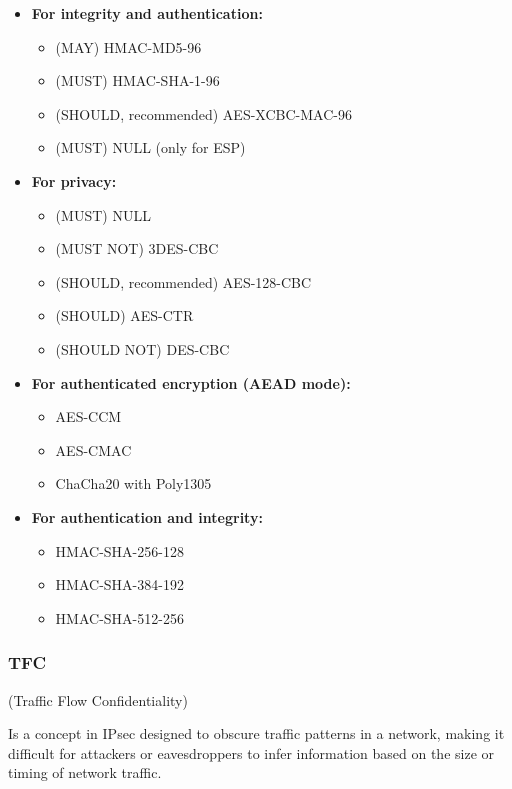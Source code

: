 \begin{itemize}
    \item \textbf{For integrity and authentication:}
    \begin{itemize}
        \item (MAY) HMAC-MD5-96
        \item (MUST) HMAC-SHA-1-96
        \item (SHOULD, recommended) AES-XCBC-MAC-96
        \item (MUST) NULL (only for ESP)
    \end{itemize}
    \item \textbf{For privacy:}
    \begin{itemize}
        \item (MUST) NULL
        \item (MUST NOT) 3DES-CBC
        \item (SHOULD, recommended) AES-128-CBC
        \item (SHOULD) AES-CTR
        \item (SHOULD NOT) DES-CBC
    \end{itemize}
    \item \textbf{For authenticated encryption (AEAD mode):}
    \begin{itemize}
        \item AES-CCM
        \item AES-CMAC
        \item ChaCha20 with Poly1305
    \end{itemize}
    \item \textbf{For authentication and integrity:}
    \begin{itemize}
        \item HMAC-SHA-256-128
        \item HMAC-SHA-384-192
        \item HMAC-SHA-512-256
    \end{itemize}

\end{itemize}

\subsubsection{TFC}
\begin{center}
    (Traffic Flow Confidentiality)
\end{center}
Is a concept in IPsec designed to obscure traffic patterns in a network, making it difficult for attackers or eavesdroppers to infer information based on the size or timing of network traffic.

